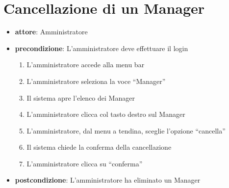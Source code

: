 \section{Cancellazione di un Manager}
\begin{itemize}
	\item \textbf{attore}: Amministratore
	\item \textbf{precondizione}: L’amministratore deve effettuare il login
	
	\begin{enumerate}
		\item L’amministratore accede alla menu bar
		\item L’amministratore seleziona la voce “Manager”
		\item Il sistema apre l’elenco dei Manager
		\item L’amministratore clicca col tasto destro sul Manager
		\item L’amministratore, dal menu a tendina, sceglie l’opzione “cancella”
		\item Il sistema chiede la conferma della cancellazione
		\item L’amministratore clicca su “conferma”
	\end{enumerate}

	\item \textbf{postcondizione}: L’amministratore ha eliminato un Manager
\end{itemize}